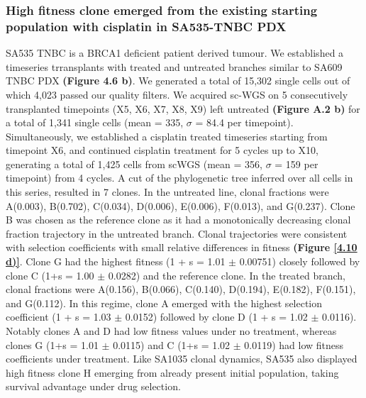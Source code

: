 \subsubsection{High fitness clone emerged from the existing starting population with cisplatin in SA535-TNBC PDX}
 SA535 TNBC is a BRCA1 deficient patient derived tumour. We established a timeseries trransplants with treated and untreated branches similar to SA609 TNBC PDX \textbf{(Figure 4.6 b)}. 
 We generated a total of 15,302 single cells out of which 4,023 passed our quality filters.
 We acquired sc-WGS on 5 consecutively transplanted timepoints (X5, X6, X7, X8, X9) left untreated \textbf{(Figure A.2 b)} for a total of 1,341 single cells (mean = 335, $\sigma$ = 84.4 per timepoint). Simultaneously, we established a cisplatin treated timeseries starting from timepoint X6, and continued cisplatin treatment for 5 cycles up to X10, generating a total of 1,425 cells from scWGS (mean = 356, $\sigma$ = 159 per timepoint) from 4 cycles. A cut of the phylogenetic tree inferred over all cells in this series, resulted in 7 clones. In the untreated line, clonal fractions were A(0.003), B(0.702), C(0.034), D(0.006), E(0.006), F(0.013), and G(0.237).
Clone B was chosen as the reference clone as it had a monotonically decreasing clonal fraction trajectory in the untreated branch. Clonal trajectories were consistent with selection coefficients
with small relative differences in fitness \textbf{(Figure \ref{4.10 d)}}. Clone G had the highest fitness (1 + s = 1.01 $\pm$ 0.00751) closely followed by clone C (1+s = 1.00 $\pm$ 0.0282) and the reference clone. In the treated branch, clonal fractions were A(0.156), B(0.066), C(0.140), D(0.194), E(0.182), F(0.151), and G(0.112). In this regime, clone A emerged with the highest selection coefficient (1 + s = 1.03
$\pm$  0.0152) followed by clone D (1 + s = 1.02 $\pm$ 0.0116). Notably clones A and D had low fitness values under no treatment, whereas clones G (1+s = 1.01 $\pm$ 0.0115) and C (1+s = 1.02 $\pm$ 0.0119) had low fitness coefficients under treatment. Like SA1035 clonal dynamics, SA535 also displayed high fitness clone H emerging from already present initial population,  taking survival advantage under drug selection.



